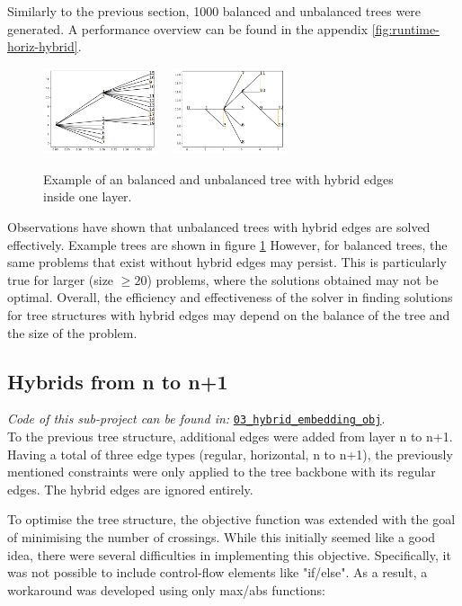 \documentclass{article}
\begin{document}
Similarly to the previous section, 1000 balanced and unbalanced trees were generated. A performance overview can be found in the appendix \ref{fig:runtime-horiz-hybrid}.
\begin{figure}[H]
    \centering
    \includegraphics[width=0.3\textwidth]{figures/hybrid_example.pdf} ~ \includegraphics[width=0.3\textwidth]{figures/hybrid_example_2.pdf}
    \caption{Example of an balanced and unbalanced tree with hybrid edges inside one layer.} 
    \label{fig:hybrid-example-horiz}
\end{figure}
Observations have shown that unbalanced trees with hybrid edges are solved effectively. Example trees are shown in figure \ref{fig:hybrid-example-horiz} However, for balanced trees, the same problems that exist without hybrid edges may persist. This is particularly true for larger (size $\geq 20$) problems, where the solutions obtained may not be optimal. Overall, the efficiency and effectiveness of the solver in finding solutions for tree structures with hybrid edges may depend on the balance of the tree and the size of the problem.


\subsection*{Hybrids from n to n+1}
\textit{Code of this sub-project can be found in: }\href{https://github.com/not-a-feature/Layouting-Phylogenetic-Networks-using-MIQP/tree/main/03_hybrid_embedding_obj}{\texttt{03\_hybrid\_embedding\_obj}}.\\
To the previous tree structure, additional edges were added from layer n to n+1. Having a total of three edge types (regular, horizontal, n to n+1), the previously mentioned constraints were only applied to the tree backbone with its regular edges. The hybrid edges are ignored entirely.

To optimise the tree structure, the objective function was extended with the goal of minimising the number of crossings. While this initially seemed like a good idea, there were several difficulties in implementing this objective. Specifically, it was not possible to include control-flow elements like "if/else". As a result, a workaround was developed using only max/abs functions:
\end{document}
